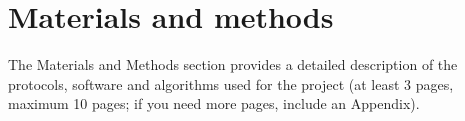 \graphicspath{{chapters/04_materials_and_methods/}}
\chapter{Materials and methods}

The Materials and Methods section provides a detailed description of the protocols,
software and algorithms used for the project (at least 3 pages, maximum 10 pages; if you need
more pages, include an Appendix).